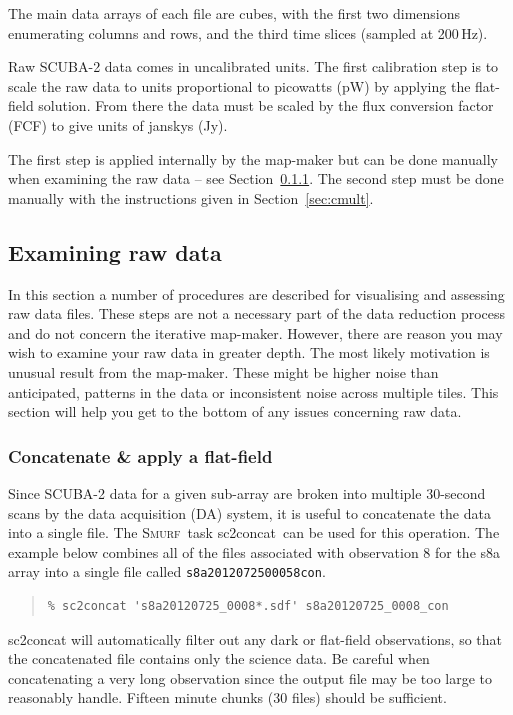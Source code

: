 \documentclass[twoside,11pt]{article}
\newcommand{\htmlref}[2]{#1}
\newcommand{\latexhtml}[2]{#1}
\newcommand{\xref}[3]{#1}
\newcommand{\xlabel}[1]{}
\renewcommand{\_}{\texttt{\symbol{95}}}
\newenvironment{myquote}{\begin{quote}\begin{small}}{\end{small}\end{quote}}
\newcommand{\smurf}{\xref{\textsc{Smurf}}{sun258}{}}
\newcommand{\task}[1]{\textsf{#1}}
\newcommand{\concat}{\xref{\task{sc2concat}}{sun258}{SC2CONCAT}}
\newcommand{\cref}[3]{\latexhtml{#1~\ref{#2}}{\htmlref{#3}{#2}}}
\begin{document}
The main data arrays of each file are cubes, with the first two
dimensions enumerating columns and rows, and the third time slices
(sampled at 200\,Hz).

Raw SCUBA-2 data comes in uncalibrated units. The first calibration
step is to scale the raw data to units proportional to picowatts (pW)
by applying the flat-field solution. From there the data must be
scaled by the flux conversion factor (FCF) to give units of janskys
(Jy).

The first step is applied internally by the map-maker but can be done
manually when examining the raw data -- see
\cref{Section}{sec:concat}{Concatenate \& apply a flat-field}.
The second step must be done manually with the instructions given in
\cref{Section}{sec:cmult}{Applying the FCF and determining fluxes}.


\subsection{\xlabel{examine}Examining raw data}
\label{sec:exam}

In this section a number of procedures are described for visualising
and assessing raw data files.  These steps are not a necessary part of
the data reduction process and do not concern the iterative map-maker.
However, there are reason you may wish to examine your raw data in
greater depth. The most likely motivation is unusual result from the
map-maker. These might be higher noise than anticipated, patterns in
the data or inconsistent noise across multiple tiles. This section
will help you get to the bottom of any issues concerning raw data.

\subsubsection{\xlabel{concat}Concatenate \& apply a flat-field}
\label{sec:concat}

Since SCUBA-2 data for a given sub-array are broken into multiple
30-second scans by the data acquisition (DA) system, it is useful to
concatenate the data into a single file. The \smurf\ task \concat\ can
be used for this operation. The example below combines all of the
files associated with observation 8 for the s8a array into a single
file called \texttt{s8a20120725\_00058\_con}.

\begin{myquote}
\begin{verbatim}
% sc2concat 's8a20120725_0008*.sdf' s8a20120725_0008_con
\end{verbatim}
\end{myquote}
\task{sc2concat} will automatically filter out any dark or flat-field
observations, so that the concatenated file contains only the science
data. Be careful when concatenating a very long observation since the
output file may be too large to reasonably handle. Fifteen minute
chunks (30 files) should be sufficient.
\end{document}
